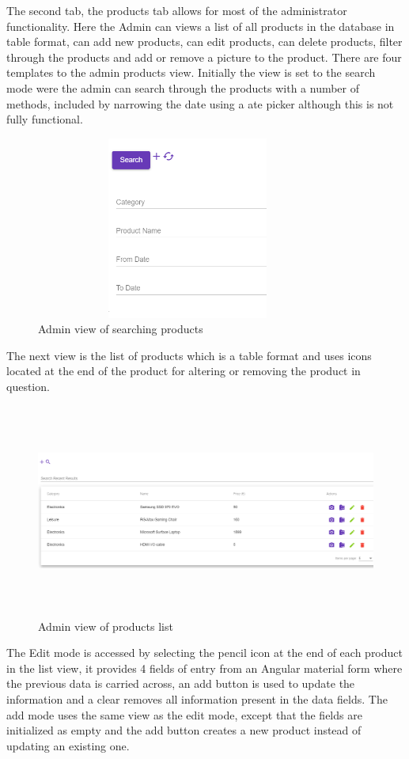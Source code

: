 The second tab, the products tab allows for most of the administrator functionality. Here the Admin can views a list of all products in the database in table format, can add new products, can edit products, can delete products, filter through the products and add or remove a picture to the product. There are four templates to the admin products view. Initially the view is set to the search mode were the admin can search through the products with a number of methods, included by narrowing the date using a ate picker although this is not fully functional. 
\newpage
\begin{figure}[h!]
    	\caption{Admin view of searching products}
	\centering
	\includegraphics[width=10cm, height=6cm]{images/adminsearch.png}
\end{figure}

The next view is the list of products which is a table format and uses icons located at the end of the product for altering or removing the product in question. 

\begin{figure}[h!]
    	\caption{Admin view of products list}
	\centering
	\includegraphics[width=15cm, height=7cm]{images/adminproducts.png}
\end{figure}

The Edit mode is accessed by selecting the pencil icon at the end of each product in the list view, it provides 4 fields of entry from an Angular material form where the previous data is carried across, an add button is used to update the information and a clear removes all information present in the data fields. The add mode uses the same view as the edit mode, except that the fields are initialized as empty and the add button creates a new product instead of updating an existing one.

